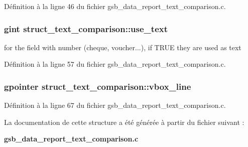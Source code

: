 Définition à la ligne 46 du fichier gsb\_\-data\_\-report\_\-text\_\-comparison.c.

\subsubsection[{use\_\-text}]{\setlength{\rightskip}{0pt plus 5cm}gint {\bf struct\_\-text\_\-comparison::use\_\-text}}\label{structstruct__text__comparison_a7a7da5e7e654c990e6f19e7185327574}
for the field with number (cheque, voucher...), if TRUE they are used as text 

Définition à la ligne 57 du fichier gsb\_\-data\_\-report\_\-text\_\-comparison.c.

\subsubsection[{vbox\_\-line}]{\setlength{\rightskip}{0pt plus 5cm}gpointer {\bf struct\_\-text\_\-comparison::vbox\_\-line}}\label{structstruct__text__comparison_a600c9dbd3c016af8c582d4fba8840c48}


Définition à la ligne 67 du fichier gsb\_\-data\_\-report\_\-text\_\-comparison.c.



La documentation de cette structure a été générée à partir du fichier suivant :\begin{DoxyCompactItemize}
\item 
{\bf gsb\_\-data\_\-report\_\-text\_\-comparison.c}\end{DoxyCompactItemize}
